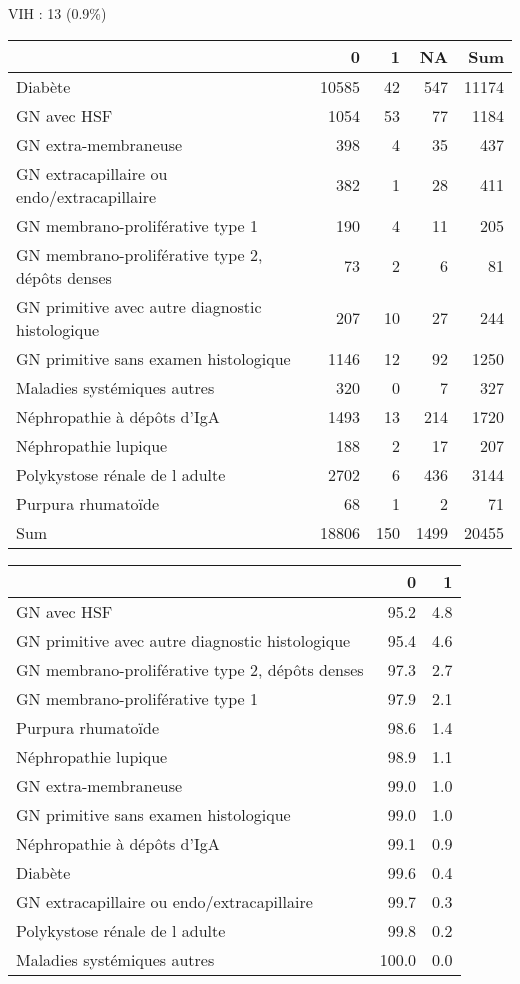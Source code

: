 \documentclass[11pt,a4paper]{article}\usepackage[]{graphicx}\usepackage[]{color}
\begin{document}
VIH : 13 (0.9\%)
\begin{table}[H]
\centering
\begin{tabular}{lrrrr}
  \hline
 & 0 & 1 & NA & Sum \\ 
  \hline
Diabète & 10585 & 42 & 547 & 11174 \\ 
  GN avec HSF & 1054 & 53 & 77 & 1184 \\ 
  GN extra-membraneuse & 398 & 4 & 35 & 437 \\ 
  GN extracapillaire ou endo/extracapillaire & 382 & 1 & 28 & 411 \\ 
  GN membrano-proliférative type 1 & 190 & 4 & 11 & 205 \\ 
  GN membrano-proliférative type 2, dépôts denses & 73 & 2 & 6 & 81 \\ 
  GN primitive avec autre diagnostic histologique & 207 & 10 & 27 & 244 \\ 
  GN primitive sans examen histologique & 1146 & 12 & 92 & 1250 \\ 
  Maladies systémiques autres & 320 & 0 & 7 & 327 \\ 
  Néphropathie à dépôts d'IgA & 1493 & 13 & 214 & 1720 \\ 
  Néphropathie lupique & 188 & 2 & 17 & 207 \\ 
  Polykystose rénale de l adulte & 2702 & 6 & 436 & 3144 \\ 
  Purpura rhumatoïde & 68 & 1 & 2 & 71 \\ 
  Sum & 18806 & 150 & 1499 & 20455 \\ 
   \hline
\end{tabular}
\end{table}
\begin{table}[H]
\centering
\begin{tabular}{lrr}
  \hline
 & 0 & 1 \\ 
  \hline
GN avec HSF & 95.2 & 4.8 \\ 
  GN primitive avec autre diagnostic histologique & 95.4 & 4.6 \\ 
  GN membrano-proliférative type 2, dépôts denses & 97.3 & 2.7 \\ 
  GN membrano-proliférative type 1 & 97.9 & 2.1 \\ 
  Purpura rhumatoïde & 98.6 & 1.4 \\ 
  Néphropathie lupique & 98.9 & 1.1 \\ 
  GN extra-membraneuse & 99.0 & 1.0 \\ 
  GN primitive sans examen histologique & 99.0 & 1.0 \\ 
  Néphropathie à dépôts d'IgA & 99.1 & 0.9 \\ 
  Diabète & 99.6 & 0.4 \\ 
  GN extracapillaire ou endo/extracapillaire & 99.7 & 0.3 \\ 
  Polykystose rénale de l adulte & 99.8 & 0.2 \\ 
  Maladies systémiques autres & 100.0 & 0.0 \\ 
   \hline
\end{tabular}
\end{table}
\end{document}
